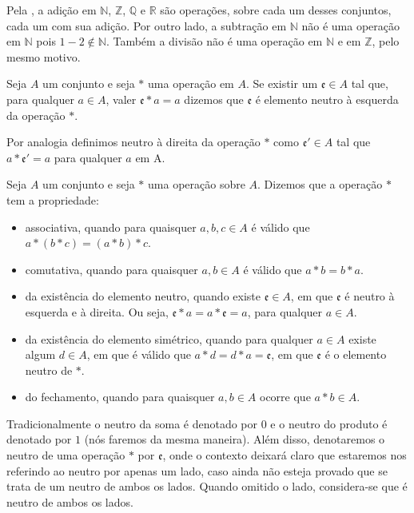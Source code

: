 \documentclass[../main.tex]{subfiles}
\begin{document}
Pela , a adição em $\mathbb{N}$, $\mathbb{Z}$, $\mathbb{Q}$ e $\mathbb{R}$ são operações, sobre cada um desses conjuntos, cada um com sua adição. Por outro lado, a subtração em $\mathbb{N}$ não é uma operação em $\mathbb{N}$ pois $1-2 \not \in \mathbb{N}$. Também a divisão não é uma operação em $\mathbb{N}$ e em $\mathbb{Z}$, pelo mesmo motivo.

\begin{defi}
    Seja $A$ um conjunto e seja $*$ uma operação em $A$. Se existir um $\mathfrak{e} \in A$ tal que, para qualquer $a \in A$, valer $\mathfrak{e} * a = a$ dizemos que $\mathfrak{e}$ é elemento neutro à esquerda da operação $*$. 
\end{defi}
Por analogia definimos neutro à direita da operação $*$ como $\mathfrak{e'} \in A$ tal que $a * \mathfrak{e'} = a$ para qualquer $a$ em A.

\begin{defi}\label{agb-def-propriedades}
    Seja $A$ um conjunto e seja $*$ uma operação sobre $A$. Dizemos que a operação $*$ tem a propriedade:
    \begin{itemize}
        \item associativa, quando para quaisquer $a,b,c \in A$ é válido que $ a * ( b * c ) = ( a * b ) * c$.
        \item comutativa, quando para quaisquer $a,b \in A$ é válido que $a * b = b * a$.
        \item da existência do elemento neutro, quando existe $\mathfrak{e} \in A$, em que $\mathfrak{e}$ é neutro à esquerda e à direita. Ou seja, $\mathfrak{e} * a = a * \mathfrak{e} = a$, para qualquer $a \in A$. 
        \item da existência do elemento simétrico, quando para qualquer $a \in A$ existe algum $d \in A$, em que é válido que $a * d = d * a = \mathfrak{e}$, em que $\mathfrak{e}$ é o elemento neutro de $*$.
        \item do fechamento, quando para quaisquer $a, b \in A$ ocorre que $a * b \in A$.   
    \end{itemize}
\end{defi}
Tradicionalmente o neutro da soma é denotado por $0$ e o neutro do produto é denotado por $1$ (nós faremos da mesma maneira). Além disso, denotaremos o neutro de uma operação $*$ por $\mathfrak{e}$, onde o contexto deixará claro que estaremos nos referindo ao neutro por apenas um lado, caso ainda não esteja provado que se trata de um neutro de ambos os lados. Quando omitido o lado, considera-se que é neutro de ambos os lados.
\end{document}
